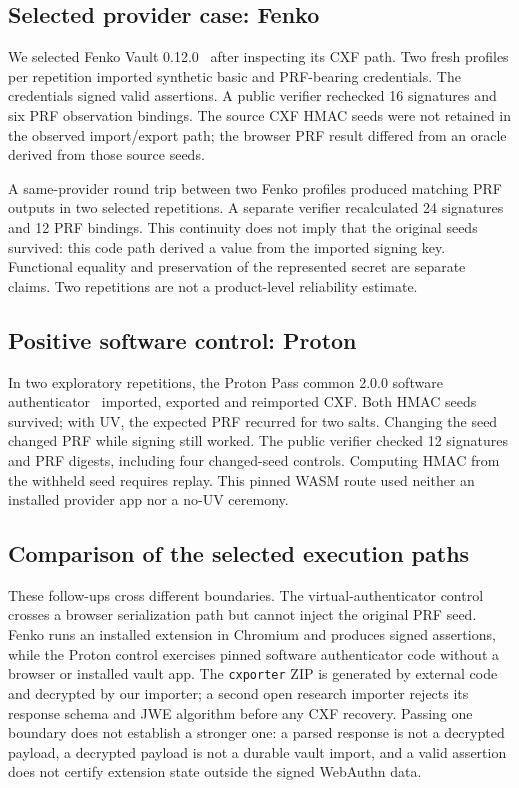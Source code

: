 \documentclass[letterpaper,twocolumn,10pt]{article}
\begin{document}
\subsection{Selected provider case: Fenko}
We selected Fenko Vault 0.12.0~\cite{fenko} after inspecting its CXF
path. Two fresh profiles per repetition imported synthetic basic and
PRF-bearing credentials. The credentials signed valid assertions. A
public verifier rechecked 16 signatures and six PRF observation bindings.
The source CXF HMAC seeds were not retained in the observed import/export
path; the browser PRF result differed from an oracle derived from those
source seeds.

A same-provider round trip between two Fenko profiles produced matching
PRF outputs in two selected repetitions. A separate verifier recalculated
24 signatures and 12 PRF bindings. This continuity does not imply that
the original seeds survived: this code path derived a value from the
imported signing key. Functional equality and preservation of the
represented secret are separate claims. Two repetitions are not a
product-level reliability estimate.

\subsection{Positive software control: Proton}
In two exploratory repetitions, the Proton Pass common 2.0.0 software
authenticator~\cite{proton} imported, exported and reimported CXF. Both
HMAC seeds survived; with UV, the expected PRF recurred for two salts.
Changing the seed changed PRF while signing still worked. The public
verifier checked 12 signatures and PRF digests, including four changed-seed
controls. Computing HMAC from the withheld seed requires replay. This
pinned WASM route used neither an installed provider app nor a no-UV
ceremony.

\subsection{Comparison of the selected execution paths}
These follow-ups cross different boundaries. The virtual-authenticator
control crosses a browser serialization path but cannot inject the
original PRF seed. Fenko runs an installed extension in Chromium and
produces signed assertions, while the Proton control exercises pinned
software authenticator code without a browser or installed vault app.
The \texttt{cxporter} ZIP is generated by external code and decrypted by
our importer; a second open research importer rejects its response schema
and JWE algorithm before any CXF recovery. Passing one boundary does not
establish a stronger one: a parsed response is not a decrypted payload,
a decrypted payload is not a durable vault import, and a valid assertion
does not certify extension state outside the signed WebAuthn data.
\end{document}
